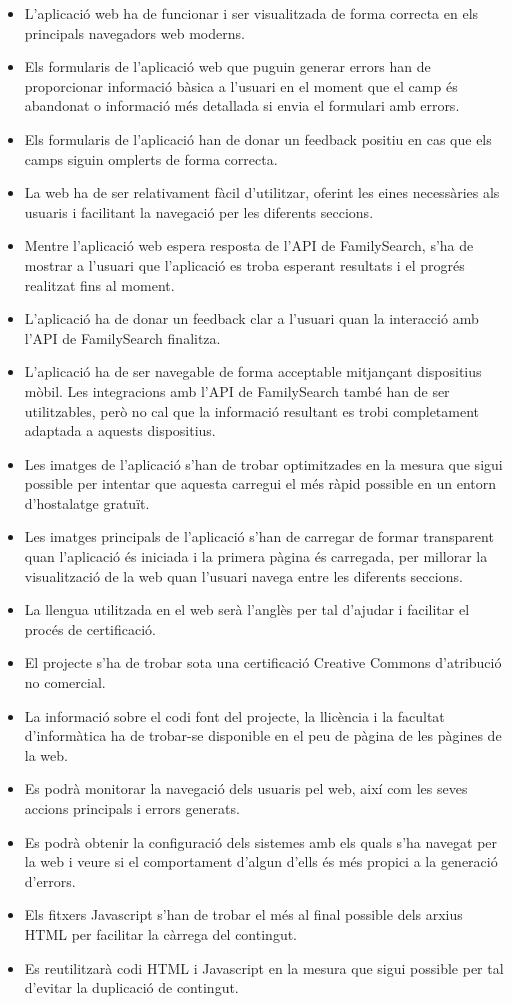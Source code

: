     \begin{itemize}
        \item L'aplicació web ha de funcionar i ser visualitzada de forma correcta en els principals navegadors web moderns.
        \item Els formularis de l'aplicació web que puguin generar errors han de proporcionar informació bàsica a l'usuari en el moment que el camp és abandonat o informació més detallada si envia el formulari amb errors.
        \item Els formularis de l’aplicació han de donar un feedback positiu en cas que els camps siguin omplerts de forma correcta.
        \item La web ha de ser relativament fàcil d'utilitzar, oferint les eines necessàries als usuaris i facilitant la navegació per les diferents seccions.
        \item Mentre l'aplicació web espera resposta de l’API de FamilySearch, s'ha de mostrar a l'usuari que l'aplicació es troba esperant resultats i el progrés realitzat fins al moment.
        \item L'aplicació ha de donar un feedback clar a l'usuari quan la interacció amb l’API de FamilySearch finalitza.
        \item L'aplicació ha de ser navegable de forma acceptable mitjançant dispositius mòbil. Les integracions amb l’API de FamilySearch també han de ser utilitzables, però no cal que la informació resultant es trobi completament adaptada a aquests dispositius.
        \item Les imatges de l'aplicació s'han de trobar optimitzades en la mesura que sigui possible per intentar que aquesta carregui el més ràpid possible en un entorn d'hostalatge gratuït.
        \item Les imatges principals de l'aplicació s'han de carregar de formar transparent quan l'aplicació és iniciada i la primera pàgina és carregada, per millorar la visualització de la web quan l'usuari navega entre les diferents seccions.
        \item La llengua utilitzada en el web serà l'anglès per tal d'ajudar i facilitar el procés de certificació.
        \item El projecte s'ha de trobar sota una certificació Creative Commons d'atribució no comercial.
        \item La informació sobre el codi font del projecte, la llicència i la facultat d'informàtica ha de trobar-se disponible en el peu de pàgina de les pàgines de la web.
        \item Es podrà monitorar la navegació dels usuaris pel web, així com les seves accions principals i errors generats.
        \item Es podrà obtenir la configuració dels sistemes amb els quals s'ha navegat per la web i veure si el comportament d'algun d'ells és més propici a la generació d'errors.
        \item Els fitxers Javascript s'han de trobar el més al final possible dels arxius HTML per facilitar la càrrega del contingut.
        \item Es reutilitzarà codi HTML i Javascript en la mesura que sigui possible per tal d'evitar la duplicació de contingut.
    \end{itemize}
